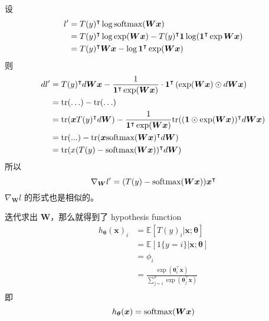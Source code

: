 			设 
			\begin{align*}
				 l' &= T(y)^\intercal \log \text{softmax}(\bm{W} \bm{x}) \\
				 &= T(y)^\intercal \log \exp (\bm{Wx}) - T(y)^\intercal \bm{1} \log (\bm{1}^\intercal \exp \bm{Wx}) \\
				 &= T(y)^\intercal \bm{Wx} - \log \bm{1}^\intercal \exp(\bm{Wx}) 
			\end{align*}
			则
			\begin{align*}
				dl' &= T(y)^\intercal d\bm{W} \bm{x} - \frac{1}{\bm{1}^\intercal \exp(\bm{Wx})} \cdot \bm{1}^\intercal \left( \exp(\bm{Wx}) \odot d\bm{Wx} \right) \\
				&= \text{tr}(\ldots) - \text{tr}(\ldots) \\
				&= \text{tr}(\bm{x} T(y)^\intercal d\bm{W}) - \frac{1}{\bm{1}^\intercal \exp(\bm{Wx})} \text{tr}( (\bm{1} \odot \exp(\bm{Wx}) )^\intercal d\bm{Wx} ) \\
				&= \text{tr}(...) - \text{tr}(\bm{x} \text{softmax}(\bm{Wx})^\intercal d\bm{W} ) \\
				&= \text{tr}(x(T(y) - \text{softmax}(\bm{Wx}))^\intercal d\bm{W})
			\end{align*}
			所以
			\begin{equation}
				\nabla_{\bm{W}} l' = (T(y) - \text{softmax}(\bm{Wx})) \bm{x}^\intercal
			\end{equation}
			$ \nabla_{\bm{W}} l $ 的形式也是相似的。
			
			迭代求出 $ \bm{W} $，那么就得到了 hypothesis function 
			\begin{align*}
				h_{\bm{\theta}} (\bm{x})_i &= \mathbb{E} [T(y)_i | \bm{x} ; \bm{\theta}] \\
				&= \mathbb{E} \left[ 1\{y=i\} | \bm{x} ; \bm{\theta} \right] \\
				&= \phi_i \\ 
				&= \frac{\exp(\bm{\theta}_i^\intercal \bm{x})}{\sum_{j=1}^{k} \exp(\bm{\theta}_j^\intercal \bm{x})} \\
			\end{align*}
			即 
			\begin{equation}
				h_{\bm{\theta}} (\bm{x}) = \text{softmax}(\bm{Wx})
			\end{equation}
		
			
			